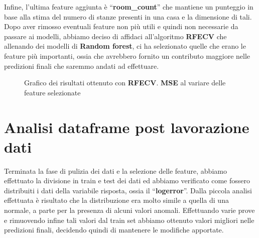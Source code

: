 Infine, l'ultima feature aggiunta è ``\textbf{room\_count}'' che mantiene un punteggio in base alla stima del numero di stanze presenti in una casa e la dimensione di tali.\\
Dopo aver rimosso eventuali feature non più utili e quindi non necessarie da passare ai modelli, abbiamo deciso di affidaci all'algoritmo \textbf{RFECV} che allenando dei modelli di \textbf{Random forest}, ci ha selezionato quelle che erano le feature più importanti, ossia che avrebbero fornito un contributo maggiore nelle predizioni finali che saremmo andati ad effettuare.
\begin{figure}[h]
    \centerline{}
   \caption{Grafico dei risultati ottenuto con \textbf{RFECV}. \textbf{MSE} al variare delle feature selezionate}
\end{figure}

\section*{Analisi dataframe post lavorazione dati}
Terminata la fase di pulizia dei dati e la selezione delle feature, abbiamo effettuato la divisione in train e test dei dati ed abbiamo verificato come fossero distribuiti i dati della variabile risposta, ossia il ``\textbf{logerror}''.
Dalla piccola analisi effettuata è risultato che la distribuzione era molto simile a quella di una normale, a parte per la presenza di alcuni valori anomali. Effettuando varie prove e rimuovendo infine tali valori dal train set abbiamo ottenuto 
valori migliori nelle predizioni finali, decidendo quindi di mantenere le modifiche apportate.

